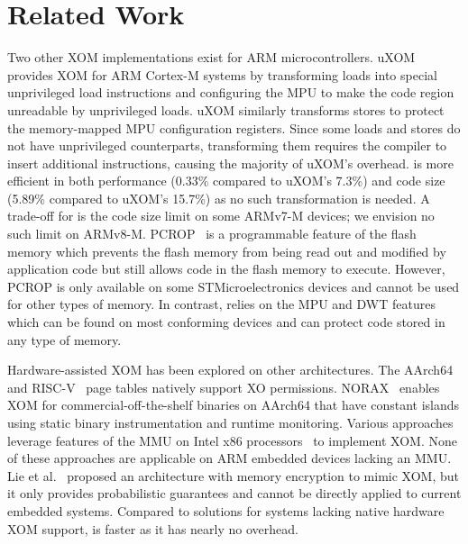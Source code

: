 \section{Related Work}
\label{sec:related}

%
%

Two other XOM implementations exist for ARM microcontrollers.
uXOM~\cite{uXOM:UsenixSec19}
provides XOM for ARM Cortex-M systems by transforming loads into
special unprivileged load
instructions and configuring the MPU to make the code region unreadable by
unprivileged loads.  uXOM similarly transforms stores to
protect the memory-mapped MPU configuration registers.  Since
some loads and stores do not have unprivileged counterparts,
transforming them requires the compiler to insert additional instructions,
causing the majority of uXOM's overhead.  {\System} is more
efficient in both performance (0.33\% compared to uXOM's 7.3\%) and code
size (5.89\% compared to uXOM's 15.7\%) as no such transformation is needed.
A trade-off for {\System} is the code size limit on some ARMv7-M
devices; we envision no such limit on ARMv8-M.
PCROP~\cite{STM32F4:PCROP:Manual} is a programmable feature of the flash
memory which prevents the flash memory from being read out and modified by
application code but still allows code in the flash memory to execute.
However, PCROP is only available on some
STMicroelectronics devices and cannot be used for other types of memory.
In contrast, {\System} relies on the MPU
and DWT features~\cite{ARMv7-M:Manual,ARMv8-M:Manual} which can
be found on most conforming devices
and can protect code stored in any type of memory.

%
%

Hardware-assisted XOM has been explored on other architectures.
The AArch64~\cite{ARMv8-A:Manual} and RISC-V~\cite{RISC-V:Priv:Manual}
page tables natively support XO permissions.
NORAX~\cite{NORAX:Oakland17} enables XOM for
commercial-off-the-shelf binaries on AArch64 that have constant islands
using static binary
instrumentation and runtime monitoring.
Various approaches~\cite{HideM:CODASPY15,Readactor:Oakland15,%
ExOShim:ICCWS16,KHide:CNS16,XOM-Switch:BlackHatAsia18,IskiOS:ArXiv19} leverage
features of the MMU on Intel x86 processors~\cite{X86:Intel:Manual}
to implement XOM.
None of these approaches are applicable on ARM embedded devices
lacking an MMU.  Lie et al.~\cite{XOM:ASPLOS00} proposed an
architecture with memory encryption to mimic XOM, but it only
provides probabilistic guarantees and cannot be directly applied to
current embedded systems.
Compared to solutions for systems lacking native hardware XOM support,
{\System} is faster as it has nearly no overhead.

